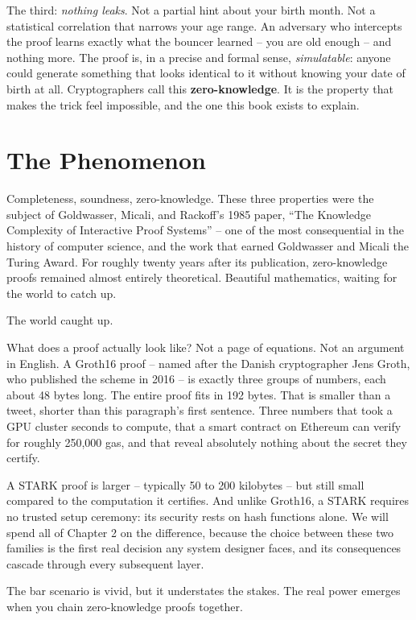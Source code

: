 \documentclass[
  11pt,
  openany]{report}
\renewcommand{\textbf}[1]{{\bfseries\color{MidnightBold}#1}}
\begin{document}
The third: \emph{nothing leaks}. Not a partial hint about your birth month. Not
a statistical correlation that narrows your age range. An adversary who
intercepts the proof learns exactly what the bouncer learned -- you are old
enough -- and nothing more. The proof is, in a precise and formal sense,
\emph{simulatable}: anyone could generate something that looks identical to it
without knowing your date of birth at all. Cryptographers call this
\textbf{zero-knowledge}. It is the property that makes the trick feel
impossible, and the one this book exists to explain.

\section{The Phenomenon}\label{the-phenomenon}

Completeness, soundness, zero-knowledge. These three properties were the subject
of Goldwasser, Micali, and Rackoff's 1985 paper, ``The Knowledge Complexity of
Interactive Proof Systems'' -- one of the most consequential in the history of
computer science, and the work that earned Goldwasser and Micali the Turing
Award. For roughly twenty years after its publication, zero-knowledge proofs
remained almost entirely theoretical. Beautiful mathematics, waiting for the
world to catch up.

The world caught up.

What does a proof actually look like? Not a page of equations. Not an argument
in English. A Groth16 proof -- named after the Danish cryptographer Jens Groth,
who published the scheme in 2016 -- is exactly three groups of numbers, each
about 48 bytes long. The entire proof fits in 192 bytes. That is smaller than a
tweet, shorter than this paragraph's first sentence. Three numbers that took a
GPU cluster seconds to compute, that a smart contract on Ethereum can verify for
roughly 250,000 gas, and that reveal absolutely nothing about the secret they
certify.

A STARK proof is larger -- typically 50 to 200 kilobytes -- but still small
compared to the computation it certifies. And unlike Groth16, a STARK requires
no trusted setup ceremony: its security rests on hash functions alone. We will
spend all of Chapter 2 on the difference, because the choice between these two
families is the first real decision any system designer faces, and its
consequences cascade through every subsequent layer.

The bar scenario is vivid, but it understates the stakes. The real power emerges
when you chain zero-knowledge proofs together.
\end{document}
